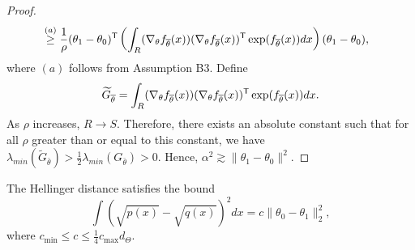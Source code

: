 \documentclass{article}
\begin{document}
\begin{proof}
\begin{align*}
  &\stackrel{(a)}\geq \frac{1}{\rho}  (\theta_1 - \theta_0)^{\mathsf{T}} 
                \left( \int_{R} ( \nabla_{\theta} f_{\overline{\theta}}(x) ) 
                                      ( \nabla_{\theta} f_{\overline{\theta}}(x) )^{\mathsf{T}}
                          \exp(f_{\overline{\theta}}(x)) dx \right) (\theta_1 - \theta_0),
\end{align*}
where $(a)$ follows from Assumption B3. Define 
\[
\widetilde{G}_{\overline{\theta}} =  \int_{R} ( \nabla_{\theta} f_{\overline{\theta}}(x) ) 
                                      ( \nabla_{\theta} f_{\overline{\theta}}(x) )^{\mathsf{T}}
                          \exp(f_{\overline{\theta}}(x)) dx.
\]
As $\rho$ increases, $R \rightarrow S$. Therefore, there exists an absolute constant such that for all $\rho$ greater than or equal to this constant, we have
$\lambda_{min}(\tilde{G}_{\bar \theta}) > \frac{1}{2} \lambda_{min}(G_{\bar \theta}) > 0$. Hence, $\alpha^2 \gtrsim \| \theta_1 - \theta_0 \|^2$.
\end{proof}




\begin{lemma}
\label{lem:hellinger_theta_equivalence}
The Hellinger distance satisfies the bound
\[
\int (\sqrt{p(x)} - \sqrt{q(x)})^2 dx = c \| \theta_0 - \theta_1 \|_2^2,
\]
where $ c_{\min} \leq c \leq \frac{1}{4} c_{\max} d_{\Theta} $.
\end{lemma}
\end{document}
